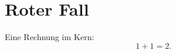 \chapter{Roter Fall}\label{c99}

Eine Rechnung im Kern:
\begin{equation}\label{c99.eq.eins}
  1 + 1 = 2.
\end{equation}
